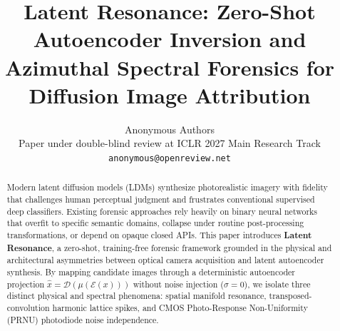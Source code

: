 \documentclass{article}
\title{Latent Resonance: Zero-Shot Autoencoder Inversion and Azimuthal Spectral Forensics for Diffusion Image Attribution}
\author{Anonymous Authors \\
Paper under double-blind review at ICLR 2027 Main Research Track \\
\texttt{anonymous@openreview.net}
}
\theoremstyle{definition}
\begin{document}
\maketitle

\begin{abstract}
Modern latent diffusion models (LDMs) synthesize photorealistic imagery with fidelity that challenges human perceptual judgment and frustrates conventional supervised deep classifiers. Existing forensic approaches rely heavily on binary neural networks that overfit to specific semantic domains, collapse under routine post-processing transformations, or depend on opaque closed APIs. This paper introduces \textbf{Latent Resonance}, a zero-shot, training-free forensic framework grounded in the physical and architectural asymmetries between optical camera acquisition and latent autoencoder synthesis. By mapping candidate images through a deterministic autoencoder projection $\hat{x} = \mathcal{D}(\mu(\mathcal{E}(x)))$ without noise injection ($\sigma = 0$), we isolate three distinct physical and spectral phenomena: spatial manifold resonance, transposed-convolution harmonic lattice spikes, and CMOS Photo-Response Non-Uniformity (PRNU) photodiode noise independence.


\end{abstract}
\end{document}
